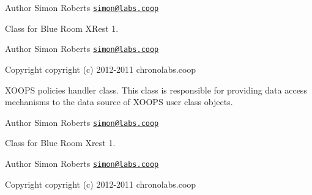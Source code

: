 \begin{DoxyAuthor}{Author}
Simon Roberts \href{mailto:simon@labs.coop}{\tt simon@labs.\-coop}
\end{DoxyAuthor}
Class for Blue Room X\-Rest 1. \begin{DoxyAuthor}{Author}
Simon Roberts \href{mailto:simon@labs.coop}{\tt simon@labs.\-coop} 
\end{DoxyAuthor}
\begin{DoxyCopyright}{Copyright}
copyright (c) 2012-\/2011 chronolabs.\-coop
\end{DoxyCopyright}
X\-O\-O\-P\-S policies handler class. This class is responsible for providing data access mechanisms to the data source of X\-O\-O\-P\-S user class objects.

\begin{DoxyAuthor}{Author}
Simon Roberts \href{mailto:simon@labs.coop}{\tt simon@labs.\-coop}
\end{DoxyAuthor}
Class for Blue Room Xrest 1. \begin{DoxyAuthor}{Author}
Simon Roberts \href{mailto:simon@labs.coop}{\tt simon@labs.\-coop} 
\end{DoxyAuthor}
\begin{DoxyCopyright}{Copyright}
copyright (c) 2012-\/2011 chronolabs.\-coop 
\end{DoxyCopyright}
